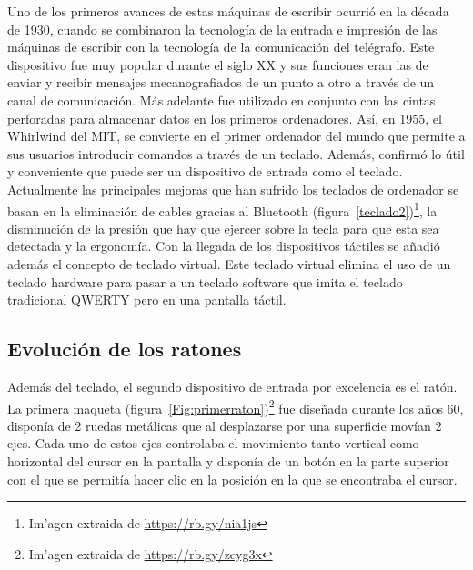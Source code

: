 Uno de los primeros avances de estas m\'aquinas de escribir ocurri\'o en la d\'ecada de 1930, cuando se combinaron la tecnolog\'ia de la entrada e impresi\'on de las m\'aquinas de escribir con la tecnolog\'ia de la comunicaci\'on del tel\'egrafo. Este dispositivo fue muy popular durante el siglo XX y sus funciones eran las de enviar y recibir mensajes mecanografiados de un punto a otro a trav\'es de un canal de comunicaci\'on. M\'as adelante fue utilizado en conjunto con las cintas perforadas para almacenar datos en los primeros ordenadores. As\'i, en 1955, el Whirlwind del MIT, se convierte en el primer ordenador del mundo que permite a sus usuarios introducir comandos a trav\'es de un teclado. Adem\'as, confirm\'o lo \'util y conveniente que puede ser un dispositivo de entrada como el teclado.\\

Actualmente las principales mejoras que han sufrido los teclados de ordenador se basan en la eliminaci\'on de cables gracias al Bluetooth (figura~\ref{teclado2})\footnote{Im'agen extraida de \url{https://rb.gy/nia1js}}, la disminuci\'on de la presi\'on que hay que ejercer sobre la tecla para que esta sea detectada y la ergonom\'ia. Con la llegada de los dispositivos t\'actiles se a\~nadi\'o adem\'as el concepto de teclado virtual. Este teclado virtual elimina el uso de un teclado hardware para pasar a un teclado software que imita el teclado tradicional QWERTY pero en una pantalla t\'actil. \\




\subsection{Evoluci\'on de los ratones}

Adem\'as del teclado, el segundo dispositivo de entrada por excelencia es el rat\'on. La primera maqueta (figura~\ref{Fig:primerraton})\footnote{Im'agen extraida de \url{https://rb.gy/zcyg3x}} fue dise\~nada durante los a\~nos 60, dispon\'ia de 2 ruedas met\'alicas que al desplazarse por una superficie mov\'ian 2 ejes. Cada uno de estos ejes controlaba el movimiento tanto vertical como horizontal del cursor en la pantalla y dispon\'ia de un bot\'on en la parte superior con el que se permit\'ia hacer clic en la posici\'on en la que se encontraba el cursor.\\

